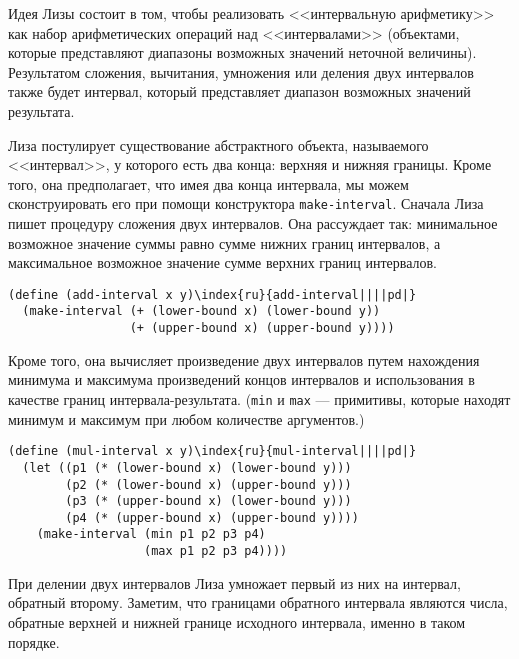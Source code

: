 Идея Лизы состоит в том, чтобы реализовать
<<интервальную арифметику>> как набор арифметических операций над
<<интервалами>> (объектами, которые представляют диапазоны возможных
значений неточной величины). Результатом сложения, вычитания,
умножения или деления двух интервалов также будет интервал, который
представляет диапазон возможных значений результата.

Лиза постулирует существование абстрактного объекта,
называемого <<интервал>>, у которого есть два конца: верхняя и нижняя
границы.  Кроме того, она предполагает, что имея два конца интервала,
мы можем сконструировать его при помощи конструктора
{\tt make-interval}.
Сначала Лиза пишет процедуру сложения двух
интервалов.  Она рассуждает так: минимальное возможное значение суммы
равно сумме нижних границ интервалов, а максимальное возможное
значение сумме верхних границ интервалов.

\begin{Verbatim}[fontsize=\small]
(define (add-interval x y)\index{ru}{add-interval||||pd|}
  (make-interval (+ (lower-bound x) (lower-bound y))
                 (+ (upper-bound x) (upper-bound y))))
\end{Verbatim}
Кроме того, она вычисляет произведение двух интервалов путем
нахождения минимума и максимума произведений концов интервалов и
использования в качестве границ
интервала-результата. ({\tt min}  
и {\tt max} ---
примитивы, которые находят минимум и максимум при любом количестве
аргументов.)

\begin{Verbatim}[fontsize=\small]
(define (mul-interval x y)\index{ru}{mul-interval||||pd|}
  (let ((p1 (* (lower-bound x) (lower-bound y)))
        (p2 (* (lower-bound x) (upper-bound y)))
        (p3 (* (upper-bound x) (lower-bound y)))
        (p4 (* (upper-bound x) (upper-bound y))))
    (make-interval (min p1 p2 p3 p4)
                   (max p1 p2 p3 p4))))
\end{Verbatim}
При делении двух интервалов Лиза умножает первый из них на интервал, 
обратный второму.  Заметим, что границами обратного интервала являются 
числа, обратные верхней и нижней границе исходного интервала, именно в 
таком порядке.

